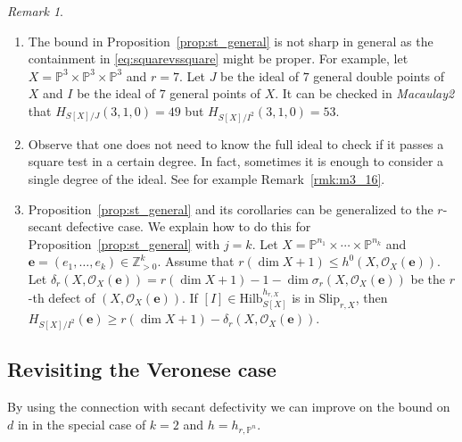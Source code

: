 \documentclass[12pt]{amsart}
\theoremstyle{definition}
\theoremstyle{remark}
\newtheorem{remark}[theorem]{Remark}
\theoremstyle{definition}
\newcommand{\HF}[2]{H_{#1}(#2)}
\newcommand{\Slip}[2]{\mathrm{Slip}_{#1,#2}}
\newcommand{\OO}{\mathcal{O}}
\newcommand{\PP}{\mathbb{P}}
\newcommand{\ZZ}{\mathbb{Z}}
\newcommand{\Hilb}{\mathrm{Hilb}}
\begin{document}
\begin{remark}
    \hfill
    \begin{enumerate}
    \item The bound in Proposition~\ref{prop:st_general} is not sharp in general as the containment in \eqref{eq:squarevssquare} might be proper.
    For example, let $X=\PP^3\times \PP^3\times \PP^3$ and $r=7$. Let $J$ be the ideal of $7$ general double points of $X$ and $I$ be the ideal of $7$ general points of $X.$ It can be checked in \textit{Macaulay2} that $\HF{S[X]/J}{3,1,0} = 49$ but $\HF{S[X]/I^2}{3,1,0} = 53$.
    \item Observe that one does not need to know the full ideal to check if it passes a square test in a certain degree. In fact, sometimes it is enough to consider a single degree of the ideal. See for example Remark~\ref{rmk:m3_16}.
    \item Proposition~\ref{prop:st_general} and its corollaries can be generalized to the $r$-secant defective case. We explain how to do this for Proposition~\ref{prop:st_general} with $j=k$.
    Let $X = \PP^{n_1}\times \cdots \times \PP^{n_k}$ and $\mathbf{e} = (e_1,\ldots, e_k) \in \ZZ^{k}_{>0}$. Assume that $r(\dim X + 1) \le h^0(X, \OO_X(\mathbf{e}))$. Let $\delta_r(X, \OO_X(\mathbf{e})) = r(\dim X+1) -1  - \dim \sigma_r(X, \OO_X(\mathbf{e}))$ be the $r$-th defect of $(X, \OO_X(\mathbf{e}))$. If $[I]\in \Hilb_{S[X]}^{h_{r, X}}$ is in $\Slip{r}{X}$, then $H_{S[X]/I^2}(\mathbf{e}) \ge r(\dim X+1) - \delta_r(X, \OO_X(\mathbf{e}))$.
    \end{enumerate}
\end{remark}


\subsection{Revisiting the Veronese case}

By using the connection with secant defectivity we can improve on the bound on $d$ in \cite[Theorem~1.1]{Man22} in the special case of $k=2$ and $h = h_{r, \PP^n}$.
\end{document}
